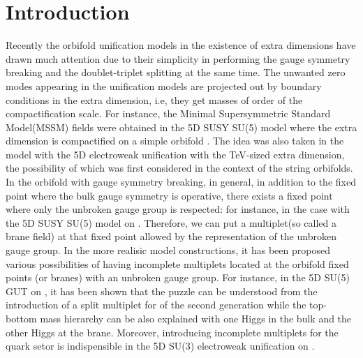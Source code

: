 \documentclass[a4paper,12pt]{article}
\begin{document}
\section{Introduction}

Recently the orbifold unification models in the existence of extra dimensions 
have 
drawn much attention due to their simplicity in performing the gauge symmetry 
breaking and the doublet-triplet splitting at the same time. 
The unwanted zero modes appearing in the unification models are projected out 
by boundary conditions in the extra dimension, i.e,  they get masses of order 
of the compactification scale. 
For instance,
the Minimal Supersymmetric Standard Model(MSSM) fields were obtained 
in the 5D SUSY SU(5) model where the extra dimension is compactified 
on a simple orbifold \coordHE{}\cite{kawamura,pointgroup,kkl0}. 
The idea was also taken in the model with the 5D \coordHE{} electroweak 
unification with the TeV-sized extra dimension\cite{su3,kkl}, the possibility 
of which was first considered in the context of the string 
orbifolds\cite{anton}.
In the orbifold with gauge symmetry breaking, in general, 
in addition to the fixed point where the bulk gauge symmetry is operative, 
there exists a fixed point where only the unbroken gauge group is 
respected\cite{pointgroup}: for instance,
\coordHE{} in the case with the 5D SUSY SU(5) model
on \coordHE{}.  
Therefore, 
we can put a multiplet(so called a brane field) at that fixed point 
allowed by the representation of
the unbroken gauge group. 
In the more
realisic model constructions, it has been proposed various possibilities
of having incomplete multiplets located at the orbifold fixed points
(or branes) with an unbroken gauge group\cite{pointgroup,kkl0,su3,kkl}.
For instance, in the 5D SU(5) GUT on \coordHE{},
it has been shown that the \coordHE{} puzzle can be understood
from the introduction of a split multiplet for \coordHE{} of the second 
generation\cite{kkl0}
while the top-bottom mass hierarchy can be also explained with one Higgs in the
bulk and the other Higgs at the brane\cite{kkl0,kkl}. 
Moreover, introducing incomplete
multiplets for the quark setor is indispensible in the 5D SU(3) electroweak
unification on \coordHE{}\cite{su3,kkl}.
\end{document}
